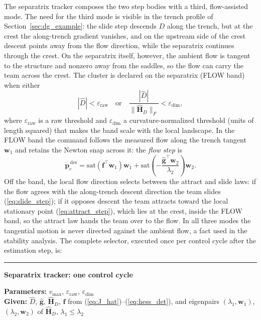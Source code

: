 \documentclass[lettersize,journal]{IEEEtran}
\begin{document}
The separatrix tracker composes the two step bodies with a third,
flow-assisted mode. The need for the third mode is visible in the trench
profile of Section~\ref{sec:dg_example}: the slide step descends $D$
along the trench, but at the crest the along-trench gradient vanishes,
and on the upstream side of the crest descent points away from the flow
direction, while the separatrix continues through the crest. On the
separatrix itself, however, the ambient flow is tangent to the structure
and nonzero away from the saddles, so the flow can carry the team across
the crest. The cluster is declared on the separatrix
(FLOW band) when either
\begin{equation}
    |\hat{D}| < \varepsilon_{\text{raw}}
    \quad\text{or}\quad
    \frac{|\hat{D}|}{\|\hat{\mathbf{H}}_D\|_F} < \varepsilon_{\text{dim}},
    \label{eq:flow_band}
\end{equation}
where $\varepsilon_{\text{raw}}$ is a raw threshold and
$\varepsilon_{\text{dim}}$ a curvature-normalized threshold (units of
length squared) that makes the band scale with the local landscape. In
the FLOW band the command follows the measured flow along the trench
tangent $\mathbf{w}_1$ and retains the Newton snap across it: the
\emph{flow step} is
\begin{equation}
    \dot{\mathbf{p}}_c^{\,\text{des}} =
    \mathrm{sat}\!\left(\mathbf{f}^\top \mathbf{w}_1\right)\mathbf{w}_1
    + \mathrm{sat}\!\left(-\frac{\hat{\mathbf{g}}^\top
    \mathbf{w}_2}{\lambda_2}\right)\mathbf{w}_2.
    \label{eq:flow_step}
\end{equation}
Off the band, the local flow direction selects between the attract and
slide laws: if the flow agrees with the along-trench descent direction
the team slides (\ref{eq:slide_step}); if it opposes descent the team
attracts toward the local stationary point (\ref{eq:attract_step}),
which lies at the crest, inside the FLOW band, so the attract law hands
the team over to the flow. In all three modes the tangential motion is
never directed against the ambient flow, a fact used in the stability
analysis. The complete selector, executed once per control cycle after
the estimation step, is:

\vspace{4pt}
\hrule
\vspace{4pt}
\noindent\textbf{Separatrix tracker: one control cycle}

\vspace{3pt}
\noindent\textbf{Parameters:} $v_{\max}$, $\varepsilon_{\text{raw}}$,
$\varepsilon_{\text{dim}}$\\
\textbf{Given:} $\hat{D}$, $\hat{\mathbf{g}}$, $\hat{\mathbf{H}}_D$,
$\mathbf{f}$ from (\ref{eq:J_hat})--(\ref{eq:hess_det}), and eigenpairs
$(\lambda_1, \mathbf{w}_1)$, $(\lambda_2, \mathbf{w}_2)$ of
$\hat{\mathbf{H}}_D$, $\lambda_1 \leq \lambda_2$
\end{document}
